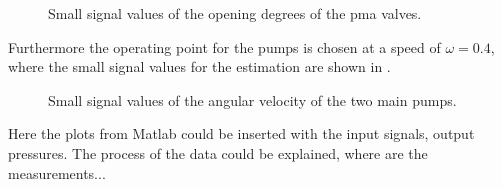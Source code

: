 \begin{figure}[H]
\centering
 
\caption{Small signal values of the opening degrees of the pma valves. }
\label{fig:est_OD_data}
\end{figure}

Furthermore the operating point for the pumps is chosen at a speed of $\omega = 0.4$, where the small signal values for the estimation are shown in . 

\begin{figure}[H]
\centering
 
\caption{Small signal values of the angular velocity of the two main pumps.}
\label{fig:est_deltap_data}
\end{figure}

Here the plots from Matlab could be inserted with the input signals, output pressures. The process of the data could be explained, where are the measurements...

